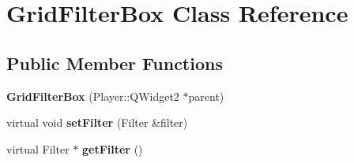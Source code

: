 \hypertarget{classGridFilterBox}{}\section{Grid\+Filter\+Box Class Reference}
\label{classGridFilterBox}
\subsection*{Public Member Functions}
\begin{DoxyCompactItemize}
\item 
\hypertarget{classGridFilterBox_a0c242e1bf0ac2aeeecd5420c80db50d5}{}{\bfseries Grid\+Filter\+Box} (Player\+::\+Q\+Widget2 $\ast$parent)\label{classGridFilterBox_a0c242e1bf0ac2aeeecd5420c80db50d5}

\item 
\hypertarget{classGridFilterBox_a09e99b0db09b8468ce7d7e0f98293ac5}{}virtual void {\bfseries set\+Filter} (Filter \&filter)\label{classGridFilterBox_a09e99b0db09b8468ce7d7e0f98293ac5}

\item 
\hypertarget{classGridFilterBox_ad7b14770615490d1445c958c79fd3adb}{}virtual Filter $\ast$ {\bfseries get\+Filter} ()\label{classGridFilterBox_ad7b14770615490d1445c958c79fd3adb}

\end{DoxyCompactItemize}
